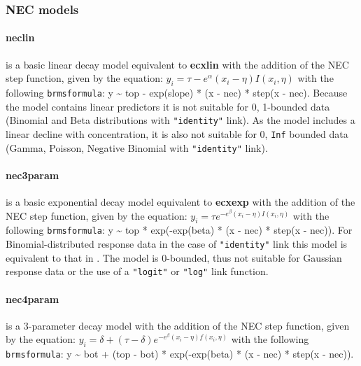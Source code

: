 \documentclass[
  shortnames]{jss}
\begin{document}
\newpage

\subsubsection[NEC models]{NEC models}\label{nec-models}

\hypertarget{neclin}{%
\paragraph{neclin}\label{neclin}}

is a basic linear decay model equivalent to \textbf{ecxlin} with the addition of the NEC step function, given by the equation:
\(y_i = \tau - e^{\alpha} \left(x_i - \eta \right) I(x_i, \eta)\)
with the following \texttt{brmsformula}: y \textasciitilde{} top - exp(slope) * (x - nec) * step(x - nec). Because the model contains linear predictors it is not suitable for 0, 1-bounded data (Binomial and Beta distributions with \texttt{"identity"} link). As the model includes a linear decline with concentration, it is also not suitable for 0, \texttt{Inf} bounded data (Gamma, Poisson, Negative Binomial with \texttt{"identity"} link).

\hypertarget{nec3param}{%
\paragraph{nec3param}\label{nec3param}}

is a basic exponential decay model equivalent to \textbf{ecxexp} with the addition of the NEC step function, given by the equation:
\(y_i = \tau e^{-e^{\beta} \left(x_i - \eta \right) I(x_i, \eta)}\)
with the following \texttt{brmsformula}: y \textasciitilde{} top * exp(-exp(beta) * (x - nec) * step(x - nec)). For Binomial-distributed response data in the case of \texttt{"identity"} link this model is equivalent to that in \citet{Fox2010}. The model is 0-bounded, thus not suitable for Gaussian response data or the use of a \texttt{"logit"} or \texttt{"log"} link function.

\hypertarget{nec4param}{%
\paragraph{nec4param}\label{nec4param}}

is a 3-parameter decay model with the addition of the NEC step function, given by the equation:
\(y_i = \delta + (\tau - \delta) e^{-e^{\beta} \left(x_i - \eta \right) f(x_i, \eta)}\)
with the following \texttt{brmsformula}: y \textasciitilde{} bot + (top - bot) * exp(-exp(beta) * (x - nec) * step(x - nec)).
\end{document}
